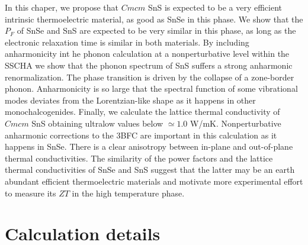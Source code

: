 In this chaper, we propose that $Cmcm$ SnS is expected to be a very efficient intrinsic thermoelectric material, as good as SnSe in this phase. We show that the $P_{F}$ of SnSe and SnS are expected to be very similar in this 
phase, as long as the electronic relaxation time is similar in both materials. By including anharmonicity int he phonon calculation at a nonperturbative level within the SSCHA we show that the phonon spectrum of SnS suffers 
a strong anharmonic renormalization. The phase transition is driven by the collapse of a zone-border phonon. Anharmonicity is so large that the spectral function of some vibrational modes deviates from the Lorentzian-like 
shape as it happens in other monochalcogenides\cite{ribeiro2018strong,li2014phonon}. Finally, we calculate the lattice thermal conductivity of $Cmcm$ SnS obtaining ultralow values below $\simeq 1.0$ W/mK. Nonperturbative 
anharmonic corrections to the 3BFC are important in this calculation as it happens in SnSe\cite{aseginolaza2019phonon}. There is a clear anisotropy between in-plane and out-of-plane thermal conductivities. The similarity
of the power factors and the lattice thermal conductivities of SnSe and SnS suggest that the latter may be an earth abundant efficient thermoelectric materials and motivate more experimental effort to measure its $ZT$ 
in the high temperature phase.

\section{Calculation details} 

